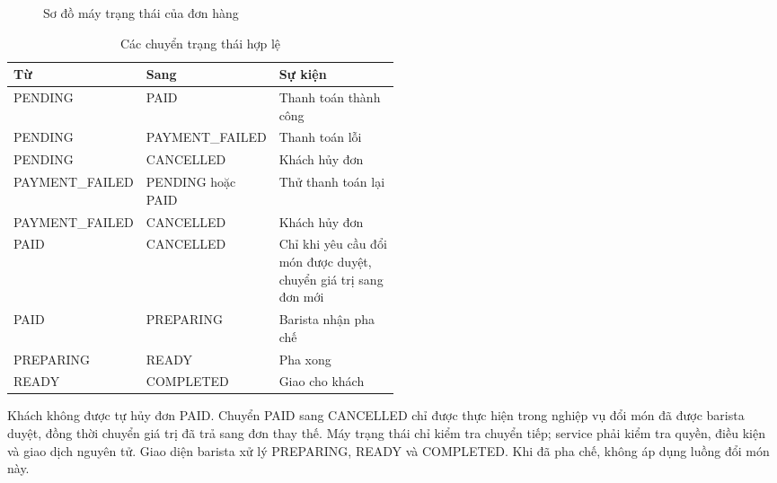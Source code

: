\documentclass[a4paper]{article}
\begin{document}
\begin{figure}[h!]
\centering
{}
\caption{Sơ đồ máy trạng thái của đơn hàng}
\end{figure}

\begin{table}[h!]
\centering
\footnotesize
\begin{tabularx}{\textwidth}{|p{0.22\linewidth}|p{0.28\linewidth}|X|}
\hline
\textbf{Từ} & \textbf{Sang} & \textbf{Sự kiện} \\ \hline
PENDING & PAID & Thanh toán thành công \\ \hline
PENDING & PAYMENT\_FAILED & Thanh toán lỗi \\ \hline
PENDING & CANCELLED & Khách hủy đơn \\ \hline
PAYMENT\_FAILED & PENDING hoặc PAID & Thử thanh toán lại \\ \hline
PAYMENT\_FAILED & CANCELLED & Khách hủy đơn \\ \hline
PAID & CANCELLED & Chỉ khi yêu cầu đổi món được duyệt, chuyển giá trị sang đơn mới \\ \hline
PAID & PREPARING & Barista nhận pha chế \\ \hline
PREPARING & READY & Pha xong \\ \hline
READY & COMPLETED & Giao cho khách \\ \hline
\end{tabularx}
\caption{Các chuyển trạng thái hợp lệ}
\end{table}

Khách không được tự hủy đơn PAID. Chuyển PAID sang CANCELLED chỉ được thực hiện trong nghiệp vụ đổi món đã được barista duyệt, đồng thời chuyển giá trị đã trả sang đơn thay thế. Máy trạng thái chỉ kiểm tra chuyển tiếp; service phải kiểm tra quyền, điều kiện và giao dịch nguyên tử. Giao diện barista xử lý PREPARING, READY và COMPLETED. Khi đã pha chế, không áp dụng luồng đổi món này.
\end{document}
